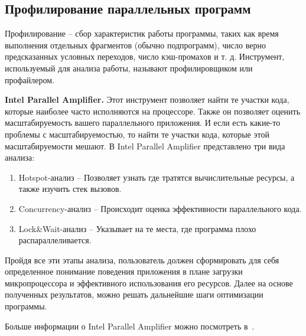 \subsection{Профилирование параллельных программ}

Профилирование -- сбор характеристик работы программы, таких как время выполнения отдельных фрагментов (обычно подпрограмм), число верно предсказанных условных переходов, число кэш-промахов и т. д. Инструмент, используемый для анализа работы, называют профилировщиком или профайлером.

\textbf{Intel Parallel Amplifier.} Этот инструмент позволяет найти те участки кода, которые наиболее часто исполняются на процессоре. Также он позволяет оценить масштабируемость вашего параллельного приложения. И если есть какие-то проблемы с масштабируемостью, то найти те участки кода, которые этой масштабируемости мешают. В Intel Parallel Amplifier представлено три вида анализа:

\begin{enumerate}
    \item Hotspot-анализ -- Позволяет узнать где тратятся вычислительные ресурсы, а также изучить стек вызовов.
    \item Concurrency-анализ -- Происходит оценка эффективности параллельного кода.
    \item Lock\&Wait-анализ -- Указывает на те места, где программа плохо распараллеливается.
\end{enumerate}

Пройдя все эти этапы анализа, пользователь должен сформировать для себя определенное понимание поведения приложения в плане загрузки микропроцессора и эффективного использования его ресурсов. Далее на основе полученных результатов, можно решать дальнейшие шаги оптимизации программы.

Больше информации о Intel Parallel Amplifier можно посмотреть в~\cite{IntelAmplifier}.
